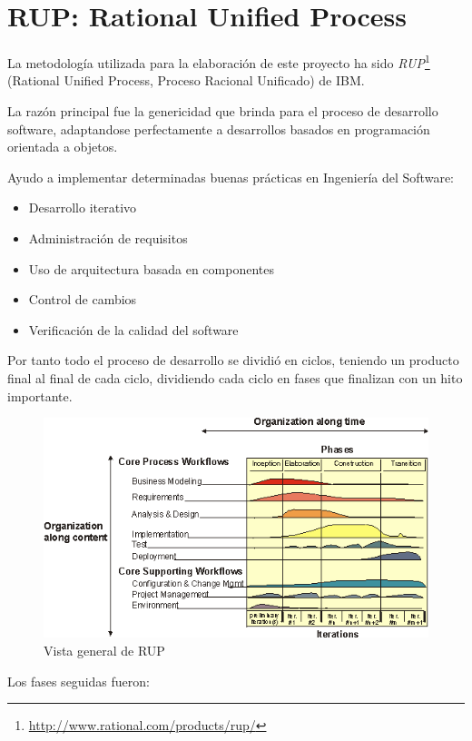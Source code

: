 
\section*{RUP: Rational Unified Process}

La metodología utilizada para la elaboración de este proyecto ha sido 
\emph{RUP}\footnote{\url{http://www.rational.com/products/rup/}}
(Rational Unified Process, Proceso Racional Unificado) de IBM.

La razón principal fue la genericidad que brinda para el proceso de desarrollo
software, adaptandose perfectamente a desarrollos basados en programación 
orientada a objetos.

Ayudo a implementar determinadas buenas prácticas en Ingeniería del Software:

\begin{itemize}
  \item Desarrollo iterativo
  \item Administración de requisitos
  \item Uso de arquitectura basada en componentes
  \item Control de cambios
  \item Verificación de la calidad del software
\end{itemize}

Por tanto todo el proceso de desarrollo se dividió en ciclos, teniendo un 
producto final al final de cada ciclo, dividiendo cada ciclo en fases que 
finalizan con un hito importante.

\begin{figure}[ht]
	\centering
	\includegraphics[width=12cm]{images/rup.png}
	\caption{Vista general de RUP}
	\label{fig:RUP}
\end{figure}

Los fases seguidas fueron:

